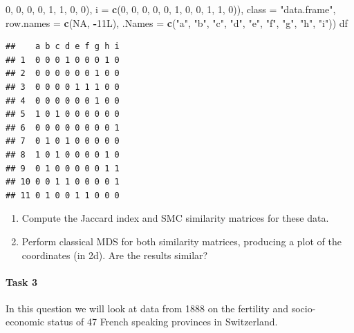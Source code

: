 \documentclass[
]{book}
\newenvironment{Shaded}{\begin{snugshade}}{\end{snugshade}}
\newcommand{\AttributeTok}[1]{\textcolor[rgb]{0.13,0.29,0.53}{#1}}
\newcommand{\ConstantTok}[1]{\textcolor[rgb]{0.56,0.35,0.01}{#1}}
\newcommand{\DataTypeTok}[1]{\textcolor[rgb]{0.13,0.29,0.53}{#1}}
\newcommand{\DecValTok}[1]{\textcolor[rgb]{0.00,0.00,0.81}{#1}}
\newcommand{\FunctionTok}[1]{\textcolor[rgb]{0.13,0.29,0.53}{\textbf{#1}}}
\newcommand{\NormalTok}[1]{#1}
\newcommand{\SpecialCharTok}[1]{\textcolor[rgb]{0.81,0.36,0.00}{\textbf{#1}}}
\newcommand{\StringTok}[1]{\textcolor[rgb]{0.31,0.60,0.02}{#1}}
\theoremstyle{definition}
\theoremstyle{definition}
\theoremstyle{definition}
\theoremstyle{definition}
\theoremstyle{remark}
\begin{document}
\begin{Shaded}
\begin{Highlighting}[]
\DecValTok{0}\NormalTok{, }\DecValTok{0}\NormalTok{, }\DecValTok{0}\NormalTok{, }\DecValTok{0}\NormalTok{, }\DecValTok{1}\NormalTok{, }\DecValTok{1}\NormalTok{, }\DecValTok{0}\NormalTok{, }\DecValTok{0}\NormalTok{), }\AttributeTok{i =} \FunctionTok{c}\NormalTok{(}\DecValTok{0}\NormalTok{, }\DecValTok{0}\NormalTok{, }\DecValTok{0}\NormalTok{, }\DecValTok{0}\NormalTok{, }\DecValTok{0}\NormalTok{, }\DecValTok{1}\NormalTok{, }\DecValTok{0}\NormalTok{, }\DecValTok{0}\NormalTok{, }\DecValTok{1}\NormalTok{, }\DecValTok{1}\NormalTok{, }
\DecValTok{0}\NormalTok{)), }\AttributeTok{class =} \StringTok{"data.frame"}\NormalTok{, }\AttributeTok{row.names =} \FunctionTok{c}\NormalTok{(}\ConstantTok{NA}\NormalTok{, }\SpecialCharTok{{-}}\DecValTok{11}\DataTypeTok{L}\NormalTok{), }\AttributeTok{.Names =} \FunctionTok{c}\NormalTok{(}\StringTok{"a"}\NormalTok{, }
\StringTok{"b"}\NormalTok{, }\StringTok{"c"}\NormalTok{, }\StringTok{"d"}\NormalTok{, }\StringTok{"e"}\NormalTok{, }\StringTok{"f"}\NormalTok{, }\StringTok{"g"}\NormalTok{, }\StringTok{"h"}\NormalTok{, }\StringTok{"i"}\NormalTok{))}
\NormalTok{df}
\end{Highlighting}
\end{Shaded}

\begin{verbatim}
##    a b c d e f g h i
## 1  0 0 0 1 0 0 0 1 0
## 2  0 0 0 0 0 0 1 0 0
## 3  0 0 0 0 1 1 1 0 0
## 4  0 0 0 0 0 0 1 0 0
## 5  1 0 1 0 0 0 0 0 0
## 6  0 0 0 0 0 0 0 0 1
## 7  0 1 0 1 0 0 0 0 0
## 8  1 0 1 0 0 0 0 1 0
## 9  0 1 0 0 0 0 0 1 1
## 10 0 0 1 1 0 0 0 0 1
## 11 0 1 0 0 1 1 0 0 0
\end{verbatim}

\begin{enumerate}
\def\labelenumi{\roman{enumi}.}
\item
  Compute the Jaccard index and SMC similarity matrices for these data.
\item
  Perform classical MDS for both similarity matrices, producing a plot of the coordinates (in 2d). Are the results similar?
\end{enumerate}

\paragraph*{Task 3}\label{task-3-1}

In this question we will look at data from 1888 on the fertility and socio-economic status of 47 French speaking provinces in Switzerland.
\end{document}

